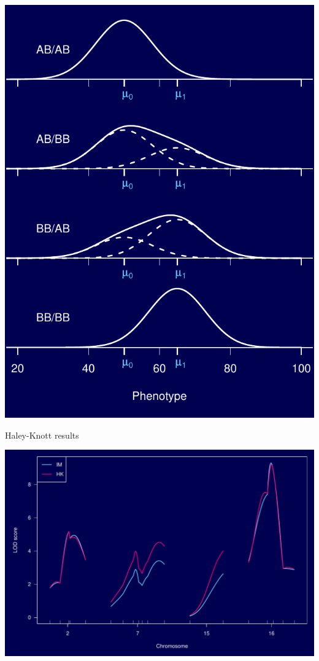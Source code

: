 \documentclass[12pt]{article}
\newcommand{\headsize}{\fontsize{35}{35} \selectfont}
\begin{document}
\begin{minipage}[t]{4.6in}
\vspace*{0mm}

\includegraphics{Figs/mixtures.pdf}
\end{minipage}




\newpage

\headsize \color{myyellow}
\hfill \begin{minipage}{5.75in}
\centering
Haley-Knott results
\end{minipage}

\vfill

\centerline{\includegraphics{Figs/hk_lod.pdf}}
\end{document}
